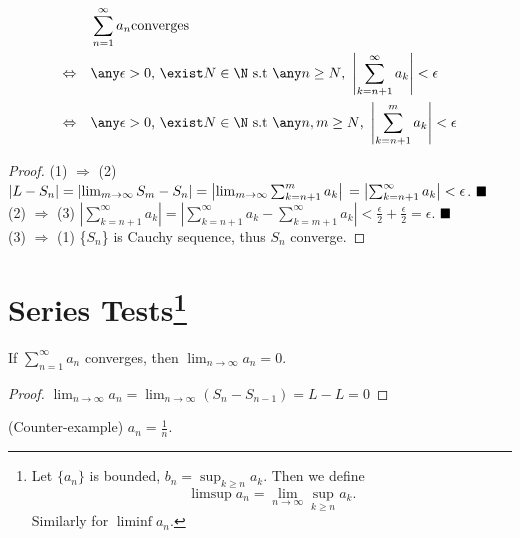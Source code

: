 \begin{theorem}
\begin{align}
                          & \sum_{n=1}^\infty a_n \text{converges} \\
    \Leftrightarrow \quad & \any \epsilon>0\text{, }\exist N \in \N\text{ s.t }\any n \geq N\text{, }\left|\sum_{k=n+1}^\infty a_k \right| < \epsilon \\
    \Leftrightarrow \quad &\any \epsilon>0\text{, }\exist N \in \N\text{ s.t }\any n,m \geq N\text{, }\left|\sum_{k=n+1}^m a_k \right| < \epsilon
\end{align}
\end{theorem} 
\begin{proof}
    (1) $\Rightarrow$ (2)\qquad $ \left|L-S_n\right| = \left|\lim_{m\to\infty} S_m - S_n\right| = \left|\lim_{m\to\infty} \sum_{k=n+1}^m a_k\right|\\ = \left|\sum_{k=n+1}^\infty a_k\right| < \epsilon$. $\hfill\blacksquare$ \vspace{1em}\\
    (2) $\Rightarrow$ (3) \qquad $\left|\sum_{k=n+1}^\infty a_k\right| = \left|\sum_{k=n+1}^\infty a_k - \sum_{k=m+1}^\infty a_k\right| < \frac{\epsilon}{2} + \frac{\epsilon}{2} = \epsilon$.  $\hfill\blacksquare$ \vspace{1em}\\
    (3) $\Rightarrow$ (1) \qquad \{$S_n$\} is Cauchy sequence, thus $S_n$ converge. 
\end{proof}

\section*{Series Tests\footnote{
Let $\{a_n\}$ is bounded, $b_n=\sup_{k\geq n} a_k$. Then we define
\[
    \limsup a_n = \lim_{n \rightarrow \infty} \sup_{k\geq n} a_k.
\]
Similarly for $\liminf a_n$.
}}

\begin{theorem}
\label{n_th term test}
    If $\sum_{n=1}^\infty a_n$ converges, then $\lim_{n\to\infty} a_n = 0$.
\end{theorem}
\begin{proof}
    $\lim_{n\to\infty} a_n = \lim_{n\to\infty} (S_n -S_{n-1}) = L -L =0$
\end{proof}
\begin{example}
    (Counter-example) $a_n = \frac{1}{n}$.
\end{example}

